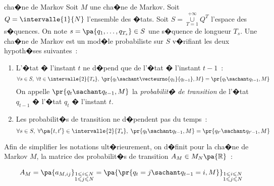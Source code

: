         \begin{xdefinition}{cha�ne de Markov}
        \label{markov_chaine_definition}%
        Soit $M$ une cha�ne de Markov.\newline
        Soit $Q = \intervalle{1}{N}$ l'ensemble des �tats.\newline
        Soit $S=\underset{T=1} {\overset{+\infty}{\cup}} Q^T$ l'espace des s�quences.\newline
        On note $s = \pa{q_1,\dots,q_{T_s}} \in S$ une s�quence de longueur $T_s$.\newline
        Une cha�ne de Markov est un mod�le probabiliste sur $S$ v�rifiant les deux hypoth�ses suivantes~:
                \begin{enumerate}
                \item L'�tat � l'instant $t$ ne d�pend que de l'�tat � l'instant $t-1$~:
                    $$
                    \forall s \in S, \; \forall t \in \intervalle{2}{T_s}, \; 
                                \pr{q_t \sachant \vecteurno{q_1}{q_{t-1}},M} = \pr{q_t \sachant q_{t-1},M}
                    $$
                    On appelle $\pr{q_t \sachant q_{t-1},M}$ la \emph{probabilit� de transition}
                    de l'�tat $q_{t-1}$ � l'�tat $q_t$ � l'instant $t$.
                \item Les probabilit�s de transition ne d�pendent pas du temps~:
                    $$
                    \forall s \in S, \; \forall \pa{t,t'} \in \intervalle{2}{T_s}, \; 
                                \pr{q_t \sachant q_{t-1},M} = \pr{q_{t'} \sachant q_{t'-1},M}
                    $$
                \end{enumerate}
        \end{xdefinition}



Afin de simplifier les notations ult�rieurement, on d�finit pour la cha�ne de Markov $M$, la matrice des probabilit�s de transition $A_M \in M_N\pa{\mathbb{R}}$~: 

        \begin{eqnarray}
        A_{M}=  \pa {  a_{M,ij} }                              _{\substack{1\leqslant i\leqslant N\\1\leqslant j\leqslant N}} =
                \pa{  \pr{  q_{t}=j \sachant q_{t-1} =i,M } }  _{\substack{1\leqslant i\leqslant N\\1\leqslant j\leqslant N}}
        \label{hmm_eq_1}
        \end{eqnarray}

